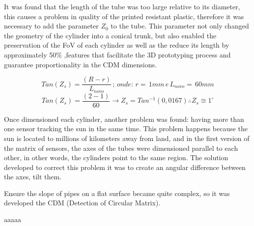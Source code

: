 \documentclass[a4paper,12pt]{article}
\begin{document}
\newpage
It was found that the length of the tube was too large relative to its diameter, this causes a problem in quality of the printed resistant plastic, therefore it was necessary to add the parameter $Z_{0}$ to the tube. This parameter not only changed the geometry of the cylinder into a conical trunk, but also enabled the preservation of the FoV of each cylinder as well as the reduce its length by approximately 50\% ,features that facilitate the 3D prototyping process and guarantee proportionality in the CDM dimensions.
	

$$Tan(Z_{s}) = \frac{(R-r)}{L_{novo}}  \, ; \,  onde: \, r= \,1mm \,e \, L_{novo}= \, 60mm $$
$$Tan(Z_{s}) = \frac{(2-1)}{60}  \longrightarrow   Z_{s} = Tan^{-1}(0,0167) \therefore Z_{s} \cong 1^{\circ} $$

Once dimensioned each cylinder, another problem was found: having more than one sensor tracking the sun in the same time. This problem happens because the sun is located to millions of kilometers away from land, and in the first version of the matrix of sensors, the axes of the tubes were dimensioned parallel to each other, in other words, the cylinders point to the same region. The solution developed to correct this problem it was to create an angular difference between the axes, tilt them.

Ensure the slope of pipes on a flat surface became quite complex, so it was  developed the CDM (Detection of Circular Matrix).

aaaaa
\end{document}
